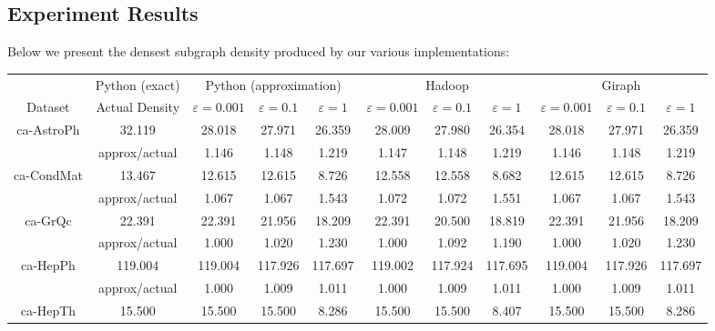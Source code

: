 \documentclass{article}
\begin{document}
\subsection{Experiment Results}
Below we present the densest subgraph density produced by our various implementations:

\begin{landscape}
\begin{tabular}{|c|c|ccc|ccc|ccc|}
\hline
                               & Python (exact) & \multicolumn{3}{|c|}{ Python (approximation) } & \multicolumn{3}{|c|}{ Hadoop } & \multicolumn{3}{|c|}{ Giraph }   \\
Dataset                        & Actual Density & $\varepsilon=0.001$ & $\varepsilon=0.1$ & $\varepsilon=1$ & $\varepsilon=0.001$ & $\varepsilon=0.1$ & $\varepsilon=1$ & $\varepsilon=0.001$ & $\varepsilon=0.1$ & $\varepsilon=1$ \\
\hline
\multirow{2}{*}{ ca-AstroPh }  & 32.119         & 28.018  & 27.971  & 26.359                   & 28.009  & 27.980  & 26.354   & 28.018  & 27.971  & 26.359     \\
                               & approx/actual  & 1.146   & 1.148   & 1.219                    & 1.147   & 1.148   & 1.219    & 1.146   & 1.148   & 1.219      \\
\hline
\multirow{2}{*}{ ca-CondMat }  & 13.467         & 12.615  & 12.615  & 8.726                    & 12.558  & 12.558  & 8.682    & 12.615  & 12.615  & 8.726      \\
                               & approx/actual  & 1.067   & 1.067   & 1.543                    & 1.072   & 1.072   & 1.551    & 1.067   & 1.067   & 1.543      \\
\hline
\multirow{2}{*}{ ca-GrQc }     & 22.391         & 22.391  & 21.956  & 18.209                   & 22.391  & 20.500  & 18.819   & 22.391  & 21.956  & 18.209     \\
                               & approx/actual  & 1.000   & 1.020   & 1.230                    & 1.000   & 1.092   & 1.190    & 1.000   & 1.020   & 1.230      \\
\hline
\multirow{2}{*}{ ca-HepPh }    & 119.004        & 119.004 & 117.926 & 117.697                  & 119.002 & 117.924 & 117.695  & 119.004 & 117.926 & 117.697    \\
                               & approx/actual  & 1.000   & 1.009   & 1.011                    & 1.000   & 1.009   & 1.011    & 1.000   & 1.009   & 1.011      \\
\hline
\multirow{2}{*}{ ca-HepTh }    & 15.500         & 15.500  & 15.500  & 8.286                    & 15.500  & 15.500  & 8.407    & 15.500  & 15.500  & 8.286      \\

\end{tabular}
\end{landscape}
\end{document}
